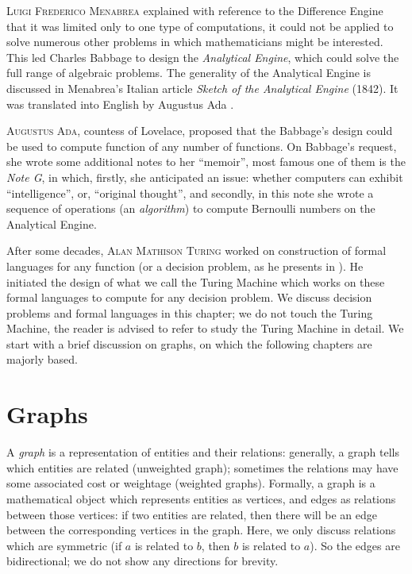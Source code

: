 \textsc{Luigi Frederico Menabrea} explained with reference to the Difference Engine that it was limited only to one type of computations, it could not be applied to solve numerous other problems in which mathematicians might be interested. This led Charles Babbage to design the \textit{Analytical Engine}, which could solve the full range of algebraic problems. The generality of the Analytical Engine is discussed in Menabrea’s Italian article \textit{Sketch of the Analytical Engine} (1842). It was translated into English by Augustus Ada \cite{Menabrea1843}.

\textsc{Augustus Ada}, countess of Lovelace, proposed that the Babbage's design could be used to compute function of any number of functions. On Babbage's request, she wrote some additional notes to her ``memoir'', most famous one of them is the \textit{Note G}, in which, firstly, she anticipated an issue: whether computers can exhibit ``intelligence'', or, ``original thought'', and secondly, in this note she wrote a sequence of operations (an \textit{algorithm}) to compute Bernoulli numbers on the Analytical Engine.

After some decades, \textsc{Alan Mathison Turing} worked on construction of formal languages for any function (or a decision problem, as he presents in \cite{Turing1937}). He initiated the design of what we call the Turing Machine  which works on these formal languages to compute for any decision problem. We discuss decision problems and formal languages in this chapter; we do not touch the Turing Machine, the reader is advised to refer \cite{Turing1937,Garey1979} to study the Turing Machine in detail. We start with a brief discussion on graphs, on which the following chapters are majorly based.

\section{Graphs}

A \textit{graph} is a representation of entities and their relations: generally, a graph tells which entities are related (unweighted graph); sometimes the relations may have some associated cost or weightage (weighted graphs). Formally, a graph is a mathematical object which represents entities as vertices, and edges as relations between those vertices: if two entities are related, then there will be an edge between the corresponding vertices in the graph. Here, we only discuss relations which are symmetric (if $a$ is related to $b$, then $b$ is related to $a$). So the edges are bidirectional; we do not show any directions for brevity.

